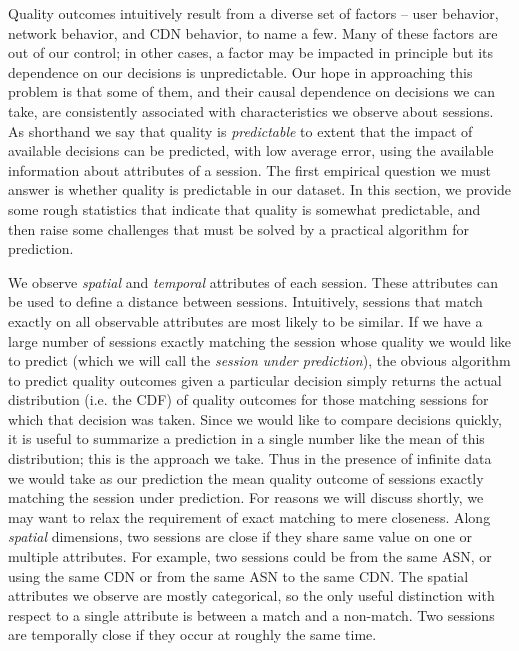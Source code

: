 \label{predictability}
Quality outcomes intuitively result from a diverse set of factors -- user behavior, network behavior, and CDN behavior, to name a few.  Many of these factors are out of our control; in other cases, a factor may be impacted in principle but its dependence on our decisions is unpredictable.  Our hope in approaching this problem is that some of them, and their causal dependence on decisions we can take, are consistently associated with characteristics we observe about sessions.  As shorthand we say that quality is {\it predictable} to extent that the impact of available decisions can be predicted, with low average error, using the available information about attributes of a session.  The first empirical question we must answer is whether quality is predictable in our dataset.  In this section, we provide some rough statistics that indicate that quality is somewhat predictable, and then raise some challenges that must be solved by a practical algorithm for prediction.

We observe {\it spatial} and {\it temporal} attributes of each session.  These attributes can be used to define a distance between sessions.  Intuitively, sessions that match exactly on all observable attributes are most likely to be similar.  If we have a large number of sessions exactly matching the session whose quality we would like to predict (which we will call the {\it session under prediction}), the obvious algorithm to predict quality outcomes given a particular decision simply returns the actual distribution (i.e. the CDF) of quality outcomes for those matching sessions for which that decision was taken.  Since we would like to compare decisions quickly, it is useful to summarize a prediction in a single number like the mean of this distribution; this is the approach we take.  Thus in the presence of infinite data we would take as our prediction the mean quality outcome of sessions exactly matching the session under prediction.  For reasons we will discuss shortly, we may want to relax the requirement of exact matching to mere closeness.  Along {\it spatial} dimensions, two sessions are close if they share same value on one or multiple attributes. For example, two sessions could be from the same ASN, or using the same CDN or from the same ASN to the same CDN. The spatial attributes we observe are mostly categorical, so the only useful distinction with respect to a single attribute is between a match and a non-match. Two sessions are temporally close if they occur at roughly the same time.

